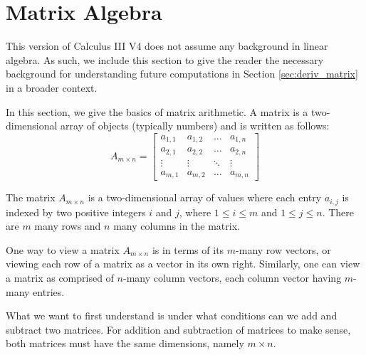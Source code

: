\section{Matrix Algebra}\label{sec:matrix_algebra}

This version of \apex Calculus III V4 does not assume any background in linear algebra.  As such, we include this section to give the reader the necessary background for understanding future computations in Section \ref{sec:deriv_matrix} in a broader context.  

\bigskip

In this section, we give the basics of matrix arithmetic.  A matrix is a two-dimensional array of objects (typically numbers) and is written as follows:
\[
A_{m \times n} = 
\begin{bmatrix}
a_{1,1} & a_{1,2} & \dots & a_{1,n}\\
a_{2,1} & a_{2,2} &\dots & a_{2,n}\\
\vdots & \vdots &\ddots&  \vdots \\
a_{m,1} & a_{m,2}  & \dots  & a_{m,n}
\end{bmatrix}
\]


The matrix $A_{m\times n}$ is a two-dimensional array of values where each entry $a_{i,j}$ is indexed by two positive integers $i$ and $j$, where $1\leq i\leq m$ and $1\leq j \leq n$.  There are $m$ many rows and $n$ many columns in the matrix.  

One way to view a matrix $A_{m\times n}$ is in terms of its $m$-many row vectors, or viewing each row of a matrix as a vector in its own right.  Similarly, one can view a matrix as comprised of $n$-many column vectors, each column vector having $m$-many entries. 
\bigskip

What we want to first understand is under what conditions can we add and subtract two matrices.  For addition and subtraction of matrices to make sense, both matrices must have the same dimensions, namely $m\times n$. \\ 

